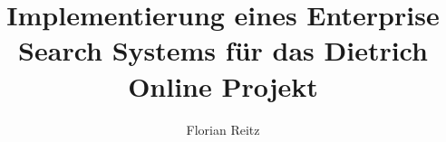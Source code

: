 \documentclass[envcountsame,envcountchap, deutsch]{i-studis}
\begin{document}
\title{Implementierung eines Enterprise Search Systems für das Dietrich Online Projekt}
\author{Florian Reitz}							%
\address{Trier, 15.10.2019} 							%
\begingroup
  \renewcommand{\thepage}{Titel}
  \mytitlepage
  \newpage
\endgroup
\frontmatter 
\tableofcontents 						%
\mainmatter                        		%





\backmatter                        		%
\printindex 							%
\begin{appendix}						%
\end{appendix}
\end{document}
